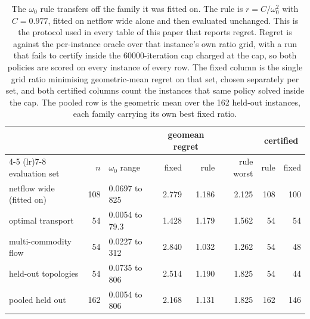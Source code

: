 \begin{table}[t]
\centering
\caption{The $\omega_0$ rule transfers off the family it was fitted on. The rule
is $r = C / \omega_0^{2}$ with $C = 0.977$, fitted on netflow wide alone and
then evaluated unchanged. This is the protocol used in every table of this paper
that reports regret. Regret is against the per-instance oracle over that
instance's own ratio grid, with a run that fails to certify inside the
60000-iteration cap charged at the cap, so both policies are scored on every
instance of every row. The fixed column is the single grid ratio minimising
geometric-mean regret on that set, chosen separately per set, and both certified
columns count the instances that same policy solved inside the cap. The pooled
row is the geometric mean over the 162 held-out instances, each family carrying
its own best fixed ratio.}
\label{tab:omega}
\begin{tabular}{lrlrrrrr}
\toprule
& & & \multicolumn{2}{c}{geomean regret} & & \multicolumn{2}{c}{certified} \\
\cmidrule(lr){4-5} \cmidrule(lr){7-8}
evaluation set & $n$ & $\omega_0$ range & fixed & rule & rule worst & rule & fixed \\
\midrule
netflow wide (fitted on) & 108 & 0.0697 to 825 & 2.779 & 1.186 & 2.125 & 108 & 100 \\
optimal transport        &  54 & 0.0054 to 79.3 & 1.428 & 1.179 & 1.562 &  54 &  54 \\
multi-commodity flow     &  54 & 0.0227 to 312 & 2.840 & 1.032 & 1.262 &  54 &  48 \\
held-out topologies      &  54 & 0.0735 to 806 & 2.514 & 1.190 & 1.825 &  54 &  44 \\
\midrule
pooled held out          & 162 & 0.0054 to 806 & 2.168 & 1.131 & 1.825 & 162 & 146 \\
\bottomrule
\end{tabular}
\end{table}

